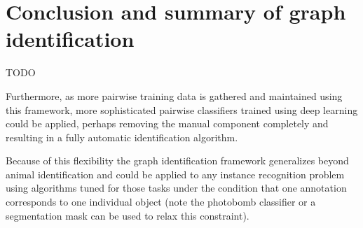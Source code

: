  
\section{Conclusion and summary of graph identification}\label{sec:graphconclusion}

TODO



  

Furthermore, as more pairwise training data is gathered and maintained using this framework, more sophisticated
  pairwise classifiers trained using deep learning could be applied, perhaps removing the manual component
  completely and resulting in a fully automatic identification algorithm.

Because of this flexibility the graph identification framework generalizes beyond animal identification and could
  be applied to any instance recognition problem using algorithms tuned for those tasks under the condition that
one annotation corresponds to one individual object (note the photobomb classifier or a segmentation mask can be
  used to relax this
  constraint).

